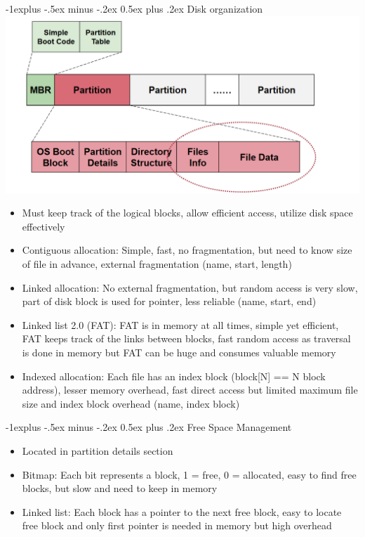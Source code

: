 \documentclass[10pt, landscape]{article}
\makeatletter
\renewcommand{\subsection}{\@startsection{subsection}{2}{0mm}%
                                {-1explus -.5ex minus -.2ex}%
                                {0.5ex plus .2ex}%
                                {\normalfont\normalsize\bfseries}}
\makeatother
\begin{document}
\begin{multicols*}{3}
\subsection{Disk organization}
\includegraphics[width=\columnwidth]{General Disk Organization.png}
\begin{itemize}
	\item Must keep track of the logical blocks, allow efficient access, utilize disk space effectively
	\item Contiguous allocation: Simple, fast, no fragmentation, but need to know size of file in advance, external fragmentation (name, start, length)
	\item Linked allocation: No external fragmentation, but random access is very slow, part of disk block is used for pointer, less reliable (name, start, end)
	\item Linked list 2.0 (FAT): FAT is in memory at all times, simple yet efficient, FAT keeps track of the links between blocks, fast random access as traversal is done in memory but FAT can be huge and consumes valuable memory
	\item Indexed allocation: Each file has an index block (block[N] == N block address), lesser memory overhead, fast direct access but limited maximum file size and index block overhead (name, index block)
\end{itemize}

\subsection{Free Space Management}
\begin{itemize}
	\item Located in partition details section
	\item Bitmap: Each bit represents a block, 1 = free, 0 = allocated, easy to find free blocks, but slow and need to keep in memory
	\item Linked list: Each block has a pointer to the next free block, easy to locate free block and only first pointer is needed in memory but high overhead
\end{itemize}


\end{multicols*}
\end{document}
